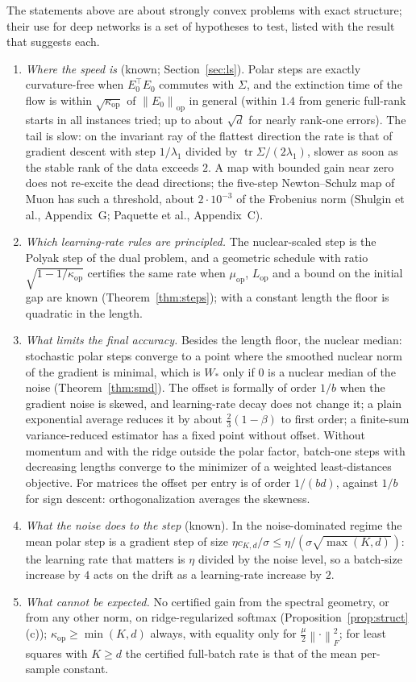 \documentclass[11pt]{article}
\theoremstyle{definition}
\theoremstyle{remark}
\newcommand{\nop}[1]{\left\|#1\right\|_{\mathrm{op}}}
\newcommand{\nF}[1]{\left\|#1\right\|_{F}}
\newcommand{\tr}{\operatorname{tr}}
\newcommand{\Lop}{L_{\mathrm{op}}}
\newcommand{\muop}{\mu_{\mathrm{op}}}
\newcommand{\kop}{\kappa_{\mathrm{op}}}
\begin{document}
The statements above are about strongly convex problems with exact structure; their use for deep networks is a set of
hypotheses to test, listed with the result that suggests each.
\begin{enumerate}[label=(\roman*)]
\item \emph{Where the speed is} (known; Section~\ref{sec:ls}). Polar steps are exactly curvature-free when
$E_0^\top E_0$ commutes with $\Sigma$, and the extinction time of the flow is within $\sqrt{\kop}$ of $\nop{E_0}$ in
general (within $1.4$ from generic full-rank starts in all instances tried; up to about $\sqrt d$ for nearly rank-one
errors). The tail is slow: on the invariant ray of the flattest direction the
rate is that of gradient descent with step $1/\lambda_1$ divided by $\tr\Sigma/(2\lambda_1)$, slower as soon as the
stable rank of the data exceeds $2$. A map with bounded gain near zero does not re-excite the dead directions; the
five-step Newton--Schulz map of Muon has such a threshold, about $2\cdot10^{-3}$ of the Frobenius norm (Shulgin et al.,
Appendix~G; Paquette et al., Appendix~C).
\item \emph{Which learning-rate rules are principled.} The nuclear-scaled step is the Polyak step of the dual problem,
and a geometric schedule with ratio $\sqrt{1-1/\kop}$ certifies the same rate when $\muop$, $\Lop$ and a bound on the
initial gap are known (Theorem~\ref{thm:steps}); with a constant length the floor is quadratic in the length.
\item \emph{What limits the final accuracy.} Besides the length floor, the nuclear median: stochastic polar steps
converge to a point where the smoothed nuclear norm of the gradient is minimal, which is $W_\ast$ only if $0$ is a
nuclear median of the noise (Theorem~\ref{thm:smd}). The offset is formally of order $1/b$ when the gradient noise is
skewed, and learning-rate decay does not change it; a plain exponential average reduces it by about
$\frac23(1-\beta)$ to first order; a finite-sum variance-reduced estimator has a fixed point without offset. Without
momentum and with the ridge outside the polar factor, batch-one steps with decreasing lengths converge to the minimizer
of a weighted least-distances objective. For matrices the offset per entry is of order $1/(bd)$, against $1/b$ for sign
descent: orthogonalization averages the skewness.
\item \emph{What the noise does to the step} (known). In the noise-dominated regime the mean polar step is a gradient
step of size $\eta c_{K,d}/\sigma\le\eta/(\sigma\sqrt{\max(K,d)})$: the learning rate that matters is $\eta$ divided by
the noise level, so a batch-size increase by $4$ acts on the drift as a learning-rate increase by $2$.
\item \emph{What cannot be expected.} No certified gain from the spectral geometry, or from any other norm, on
ridge-regularized softmax (Proposition~\ref{prop:struct}(c)); $\kop\ge\min(K,d)$ always, with equality only for
$\frac\mu2\nF\cdot^2$; for least squares with $K\ge d$ the certified full-batch rate is that of the mean per-sample
constant.
\end{enumerate}
\end{document}
